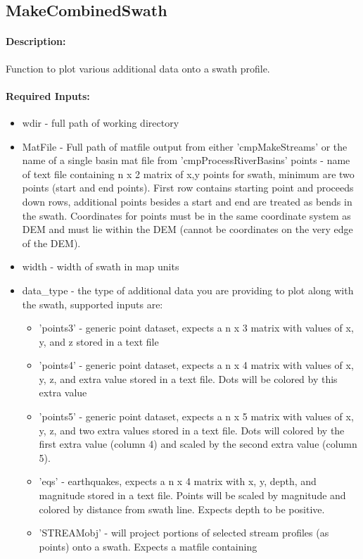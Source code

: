 \subsection{MakeCombinedSwath}
\paragraph{Description:}
Function to plot various additional data onto a swath profile.

\paragraph{Required Inputs:}
\begin{itemize}
\item wdir - full path of working directory
\item MatFile - Full path of matfile output from either 'cmpMakeStreams' or the name of a single basin mat file from 'cmpProcessRiverBasins'
points - name of text file containing n x 2 matrix of x,y points for swath, minimum are two points (start and end points).
First row contains starting point and proceeds down rows, additional points besides a start and end are
treated as bends in the swath. Coordinates for points must be in the same coordinate system as DEM and must
lie within the DEM (cannot be coordinates on the very edge of the DEM).
\item width - width of swath in map units
\item data\_type - the type of additional data you are providing to plot along with the swath, supported inputs are:
\begin{itemize}
\item 'points3' - generic point dataset, expects a n x 3 matrix with values of x, y, and z stored in a text file
\item 'points4' - generic point dataset, expects a n x 4 matrix with values of x, y, z, and extra value stored in a
text file. Dots will be colored by this extra value
\item 'points5' - generic point dataset, expects a n x 5 matrix with values of x, y, z, and two extra values stored in
a text file. Dots will colored by the first extra value (column 4) and scaled by the second extra value 
(column 5).
\item 'eqs' - earthquakes, expects a n x 4 matrix with x, y, depth, and magnitude stored in a text file. Points will be 
scaled by magnitude and colored by distance from swath line. Expects depth to be positive.
\item 'STREAMobj' - will project portions of selected stream profiles (as points) onto a swath. Expects a matfile containing 

\end{itemize}
\end{itemize}
